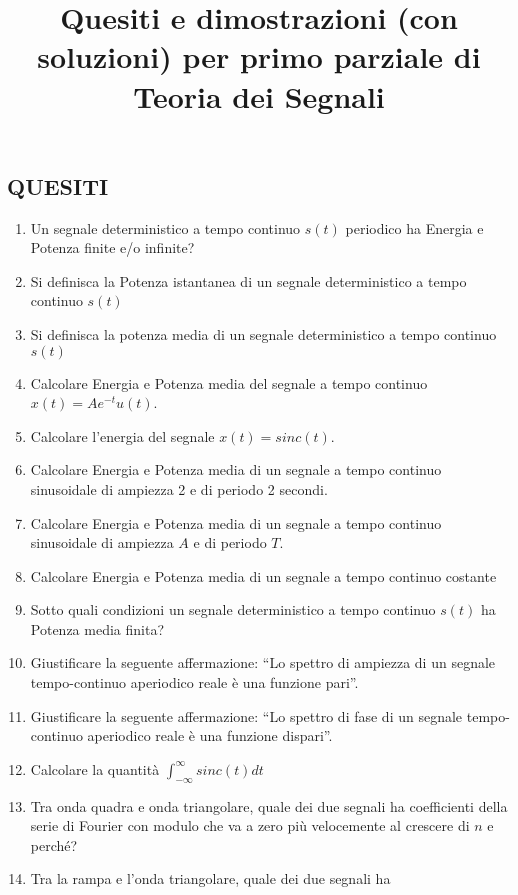 \documentclass[
]{article}
\title{Quesiti e dimostrazioni (con soluzioni) per primo parziale di
Teoria dei Segnali}
\author{}
\date{}
\providecommand{\tightlist}{%
  \setlength{\itemsep}{0pt}\setlength{\parskip}{0pt}}
\begin{document}

\subsection{QUESITI}\label{quesiti}

\begin{enumerate}
\def\labelenumi{\arabic{enumi}.}
\item
  Un segnale deterministico a tempo continuo \(s(t)\) periodico ha
  Energia e Potenza finite e/o infinite?
\item
  Si definisca la Potenza istantanea di un segnale deterministico a
  tempo continuo \(s(t)\)
\item
  Si definisca la potenza media di un segnale deterministico a tempo
  continuo \(s(t)\)
\item
  Calcolare Energia e Potenza media del segnale a tempo continuo
  \(x(t) = Ae ^{-t} u(t)\).
\item
  Calcolare l'energia del segnale \(x(t) = sinc(t)\).
\item
  Calcolare Energia e Potenza media di un segnale a tempo continuo
  sinusoidale di ampiezza 2 e di periodo 2 secondi.
\item
  Calcolare Energia e Potenza media di un segnale a tempo continuo
  sinusoidale di ampiezza \(A\) e di periodo \(T\).
\item
  Calcolare Energia e Potenza media di un segnale a tempo continuo
  costante
\item
  Sotto quali condizioni un segnale deterministico a tempo continuo
  \(s(t)\) ha Potenza media finita?
\item
  Giustificare la seguente affermazione: ``Lo spettro di ampiezza di un
  segnale tempo-continuo aperiodico reale è una funzione pari''.
\item
  Giustificare la seguente affermazione: ``Lo spettro di fase di un
  segnale tempo-continuo aperiodico reale è una funzione dispari''.
\item
  Calcolare la quantità \(\int_{- \infty}^{\infty} sinc(t) dt\)
\item
  Tra onda quadra e onda triangolare, quale dei due segnali ha
  coefficienti della serie di Fourier con modulo che va a zero più
  velocemente al crescere di \(n\) e perché?
\item
  Tra la rampa e l'onda triangolare, quale dei due segnali ha

\end{enumerate}
\end{document}
